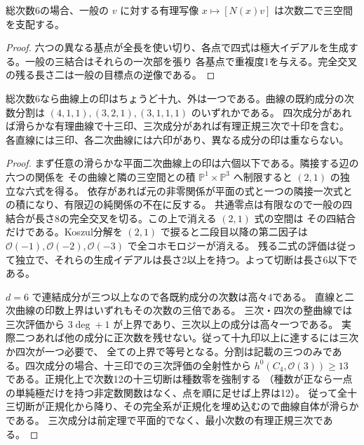 \begin{corollary}\label{cor:degree-six-columns-double-cover}
総次数6の場合、一般の $v$ に対する有理写像 $x\mapsto[N(x)v]$ は次数二で三空間を支配する。
\end{corollary}
\begin{proof}
六つの異なる基点が全長を使い切り、各点で四式は極大イデアルを生成する。一般の三結合はそれらの一次部を張り
各基点で重複度1を与える。完全交叉の残る長さ二は一般の目標点の逆像である。
\end{proof}

\begin{proposition}\label{prop:degree-six-rank-one-component-partitions}
総次数6なら曲線上の印はちょうど十九、外は一つである。曲線の既約成分の次数分割は
$(4,1,1),(3,2,1),(3,1,1,1)$ のいずれかである。
四次成分があれば滑らかな有理曲線で十三印、三次成分があれば有理正規三次で十印を含む。
各直線には三印、各二次曲線には六印があり、異なる成分の印は重ならない。
\end{proposition}
\begin{proof}
まず任意の滑らかな平面二次曲線上の印は六個以下である。隣接する辺の六つの関係を
その曲線と隣の三空間との積 $\mathbb P^1\times\mathbb P^3$ へ制限すると $(2,1)$ の独立な六式を得る。
依存があれば元の非零関係が平面の式と一つの隣接一次式との積になり、有限辺の純関係の不在に反する。
共通零点は有限なので一般の四結合が長さ8の完全交叉を切る。この上で消える $(2,1)$ 式の空間は
その四結合だけである。Koszul分解を $(2,1)$ で捩ると二段目以降の第二因子は
$\mathcal O(-1),\mathcal O(-2),\mathcal O(-3)$ で全コホモロジーが消える。
残る二式の評価は従って独立で、それらの生成イデアルは長さ2以上を持つ。よって切断は長さ6以下である。

$d=6$ で連結成分が三つ以上なので各既約成分の次数は高々4である。
直線と二次曲線の印数上界はいずれもその次数の三倍である。
三次・四次の整曲線では三次評価から $3\deg+1$ が上界であり、三次以上の成分は高々一つである。
実際二つあれば他の成分に正次数を残せない。従って十九印以上に達するには三次か四次が一つ必要で、
全ての上界で等号となる。分割は記載の三つのみである。四次成分の場合、十三印での三次評価の全射性から
$h^0(C_4,\mathcal O(3))\ge13$ である。正規化上で次数12の十三切断は種数零を強制する
（種数が正なら一点の単純極だけを持つ非定数関数はなく、点を順に足せば上界は12）。
従って全十三切断が正規化から降り、その完全系が正規化を埋め込むので曲線自体が滑らかである。
三次成分は前定理で平面的でなく、最小次数の有理正規三次である。
\end{proof}
